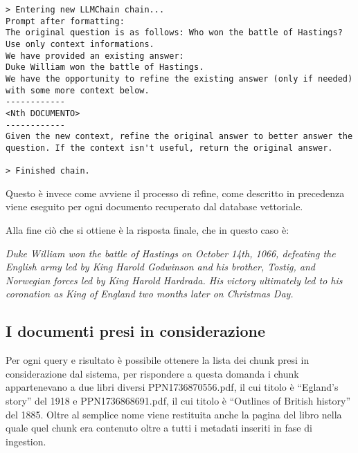 \begin{lstlisting}[breaklines]
    > Entering new LLMChain chain...
Prompt after formatting:
The original question is as follows: Who won the battle of Hastings? Use only context informations.
We have provided an existing answer: 
Duke William won the battle of Hastings.
We have the opportunity to refine the existing answer (only if needed) with some more context below.
------------
<Nth DOCUMENTO>
------------
Given the new context, refine the original answer to better answer the question. If the context isn't useful, return the original answer.

> Finished chain.
\end{lstlisting}

Questo è invece come avviene il processo di refine, come descritto in precedenza viene eseguito per ogni documento recuperato dal database vettoriale.

Alla fine ciò che si ottiene è la risposta finale, che in questo caso è:

\textit{Duke William won the battle of Hastings on October 14th, 1066, defeating the English army led by King Harold Godwinson and his brother, Tostig, and Norwegian forces led by King Harold Hardrada. His victory ultimately led to his coronation as King of England two months later on Christmas Day.}

\subsection{I documenti presi in considerazione}
Per ogni query e risultato è possibile ottenere la lista dei chunk presi in considerazione dal sistema, per rispondere a questa domanda i chunk appartenevano a due libri diversi PPN1736870556.pdf, il cui titolo è ``Egland's story'' del 1918 e PPN1736868691.pdf, il cui titolo è ``Outlines of British history'' del 1885.
Oltre al semplice nome viene restituita anche la pagina del libro nella quale quel chunk era contenuto oltre a tutti i metadati inseriti in fase di ingestion.